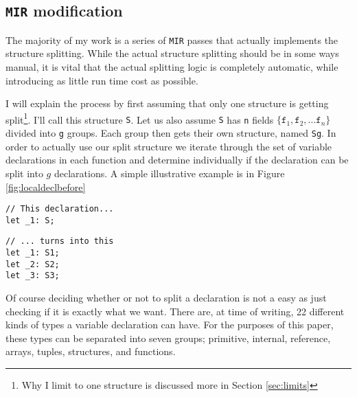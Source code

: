 \documentclass[12pt,final]{article}
\newcommand{\mirname}{{\texttt{MIR}}}
\def \mir {\mirname{}\xspace}
\newcommand{\teststructname}{{\texttt{S}}}
\def \S {\teststructname{}\xspace}
\begin{document}
\subsection{\mir modification}

The majority of my work is a series of \mir passes that actually
implements the structure splitting. While the actual structure splitting should
be in some ways manual, it is vital that the actual splitting logic is
completely automatic, while introducing as little run time cost as possible.

I will explain the process by first assuming that only one structure is getting
split\footnote{Why I limit to one structure is discussed more in Section
\ref{sec:limits}}. I'll call this structure \S. Let us also assume \S has \texttt{n}
fields $\{\texttt{f}_1, \texttt{f}_2, ... \texttt{f}_n\}$
divided into \texttt{g} groups.
Each group then gets their own structure, named \texttt{Sg}.
In order to actually use our split structure we iterate through the set
of variable declarations in each function and determine individually if the
declaration can be split into $g$ declarations. A simple illustrative example is
in Figure \ref{fig:localdeclbefore}

\begin{figure*}
  \begin{minipage}[t]{0.5\linewidth}
\begin{verbatim}
// This declaration...
let _1: S;
\end{verbatim}
  \end{minipage}
  \begin{minipage}[t]{0.5\linewidth}
\begin{verbatim}
// ... turns into this
let _1: S1;
let _2: S2;
let _3: S3;
\end{verbatim}
  \end{minipage}
  
  \caption{Simple Local Declarations Splitting $g = 3$}
  \label{fig:localdeclbefore}
\end{figure*}

Of course deciding whether or not to split a declaration is not a easy as just
checking if it is exactly what we want.  
There are, at time of writing, 22 different kinds of types a variable declaration
can have. For the purposes of this paper, these types can be separated into seven
groups; primitive, internal, reference, arrays, tuples, structures,
and functions.
\end{document}
